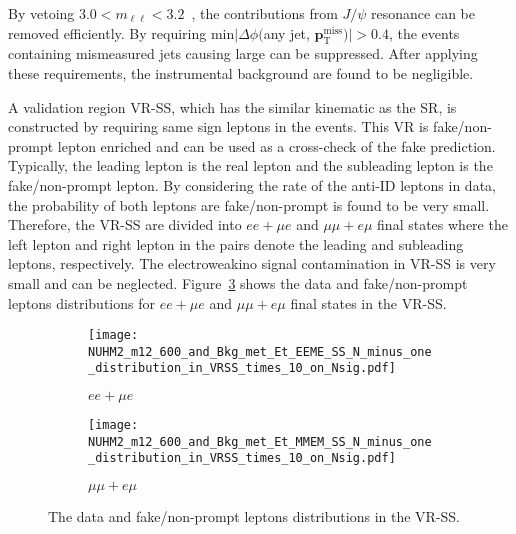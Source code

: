 By vetoing $3.0 < m_{\ell \ell} < 3.2$~{\GeV}, the contributions from $J/\psi$ resonance can be removed efficiently.
By requiring min$|\Delta \phi($any jet, $\mathbf{p}^{\mathrm{miss}}_{\mathrm{T}})| > 0.4$, the events containing mismeasured jets causing large \met can be suppressed.
After applying these requirements, the instrumental \met background are found to be negligible.

A validation region VR-SS, which has the similar kinematic as the SR, is constructed by requiring same sign leptons in the events.
This VR is fake/non-prompt lepton enriched and can be used as a cross-check of the fake prediction. 
Typically, the leading lepton is the real lepton and the subleading lepton is the fake/non-prompt lepton.
By considering the rate of the anti-ID leptons in data, the probability of both leptons are fake/non-prompt is found to be very small.
Therefore, the VR-SS are divided into $ee+\mu e$ and $\mu \mu + e\mu$ final states where the left lepton and right lepton in the pairs denote the leading and subleading leptons, respectively.
The electroweakino signal contamination in VR-SS is very small and can be neglected.
Figure~\ref{fig:bkg_fake_distributions} shows the data and fake/non-prompt leptons \met distributions for $ee+\mu e$ and $\mu \mu + e\mu$ final states in the VR-SS.

\begin{figure}[htbp]
    \begin{center}
        \begin{subfigure}[b]{0.48\textwidth}
            \texttt{[image: NUHM2\_m12\_600\_and\_Bkg\_met\_Et\_EEME\_SS\_N\_minus\_one\_distribution\_in\_VRSS\_times\_10\_on\_Nsig.pdf]}
            \caption{$ee+\mu e$}
            \label{fig:bkg_ee_mue_fake_distribution}
        \end{subfigure}
        \begin{subfigure}[b]{0.48\textwidth}
            \texttt{[image: NUHM2\_m12\_600\_and\_Bkg\_met\_Et\_MMEM\_SS\_N\_minus\_one\_distribution\_in\_VRSS\_times\_10\_on\_Nsig.pdf]}
            \caption{$\mu \mu + e\mu$}
            \label{fig:bkg_mumu_emu_fake_distribution}
        \end{subfigure}
        \caption{The data and fake/non-prompt leptons \met distributions in the VR-SS.}
        \label{fig:bkg_fake_distributions}
    \end{center}
\end{figure}

